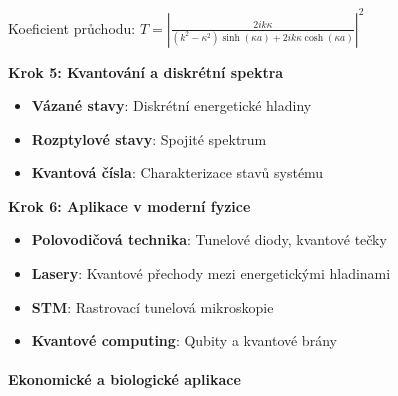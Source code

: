 \begin{example}
Koeficient průchodu: $T = \left|\frac{2ik\kappa}{(k^2 - \kappa^2)\sinh(\kappa a) + 2ik\kappa\cosh(\kappa a)}\right|^2$

\vspace{1\baselineskip}

\noindent\textbf{Krok 5: Kvantování a diskrétní spektra}
\begin{itemize}
\item \textbf{Vázané stavy}: Diskrétní energetické hladiny
\item \textbf{Rozptylové stavy}: Spojité spektrum
\item \textbf{Kvantová čísla}: Charakterizace stavů systému
\end{itemize}

\vspace{1\baselineskip}

\noindent\textbf{Krok 6: Aplikace v moderní fyzice}
\begin{itemize}
\item \textbf{Polovodičová technika}: Tunelové diody, kvantové tečky
\item \textbf{Lasery}: Kvantové přechody mezi energetickými hladinami
\item \textbf{STM}: Rastrovací tunelová mikroskopie
\item \textbf{Kvantové computing}: Qubity a kvantové brány
\end{itemize}

\end{example}

\paragraph{Ekonomické a biologické aplikace}

